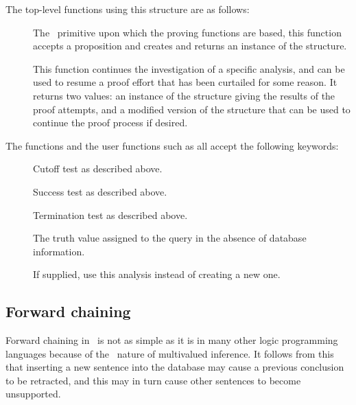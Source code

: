 The top-level functions using this structure are as follows:
 \begin{description}
 \item [] The \mvl\ primitive upon which
the proving functions are based, this function accepts a proposition
and creates and returns an instance of the  structure.
 \item [] This function continues the
investigation of a specific analysis, and can be used to resume a
proof effort that has been curtailed for some reason.  It returns two
values: an instance of the  structure giving the results
of the proof attempts, and a modified version of the 
structure that can be used to continue the proof process if desired.
 \end{description}

The functions  and the user functions such as
 all accept the following keywords:
 \begin{description}
 \item [] Cutoff test as described above.
 \item [] Success test as described above.
 \item [] Termination test as described above.
 \item [] The truth value assigned to the query in
the absence of database information.
 \item []  If supplied, use this analysis instead of
creating a new one.
 \end{description}

\subsection{Forward chaining}
\label{s.fc}

Forward chaining in \mvl\ is not as simple as it is in many other
logic programming languages because of the \nm\ nature of multivalued
inference.  It follows from this that inserting a new sentence into
the database may cause a previous conclusion to be retracted, and
this may in turn cause other sentences to become unsupported.

